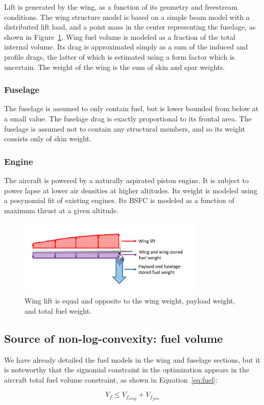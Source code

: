 Lift is generated by the wing, as a function of its geometry and freestream conditions.
The wing structure model is based on a simple beam model with a distributed lift load,
and a point mass in the center representing the fuselage, as shown in Figure~\ref{fig:liftweight}.
Wing fuel volume is modeled as a fraction of the total internal volume. Its drag is
approximated simply as a sum of the induced and profile drags, the latter of which is estimated using a
form factor which is uncertain. The weight of the wing is the sum of skin and spar weights.

\subsubsection{Fuselage}

The fuselage is assumed to only contain fuel, but is lower bounded from below at a small value.
The fuselage drag is exactly proportional to its frontal area.
The fuselage is assumed not to contain any structural members, and so its weight consists only of skin weight.

\subsubsection{Engine}

The aircraft is powered by a naturally aspirated piston engine. It is subject to
power lapse at lower air densities at higher altitudes. Its weight is modeled using a posynomial fit of existing
engines. Its \gls{BSFC} is modeled as a function of maximum thrust at a given altitude.


\begin{figure}
\centering
\caption{\label{fig:liftweight} Wing lift is equal and opposite to the wing weight, payload weight, and total fuel weight.}
\includegraphics[width=0.8\textwidth]{liftweight.PNG}
\end{figure}

\subsection{Source of non-log-convexity: fuel volume}
We have already detailed the fuel models in the wing and fuselage sections, but it is noteworthy that
the signomial constraint in the optimization appears in the aircraft total fuel volume constraint,
as shown in Equation~\ref{eq:fuel}:

\begin{equation}
\label{eq:fuel}
V_f \leq V_{f_{wing}} + V_{f_{fuse}} 
\end{equation}
